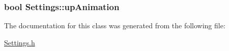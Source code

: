 \subsubsection[{\texorpdfstring{up\+Animation}{upAnimation}}]{\setlength{\rightskip}{0pt plus 5cm}bool Settings\+::up\+Animation\hspace{0.3cm}{\ttfamily [private]}}\hypertarget{classSettings_a67a1520a803f8cd6c45d236f0be4796f}{}\label{classSettings_a67a1520a803f8cd6c45d236f0be4796f}


The documentation for this class was generated from the following file\+:\begin{DoxyCompactItemize}
\item 
\hyperlink{Settings_8h}{Settings.\+h}\end{DoxyCompactItemize}
